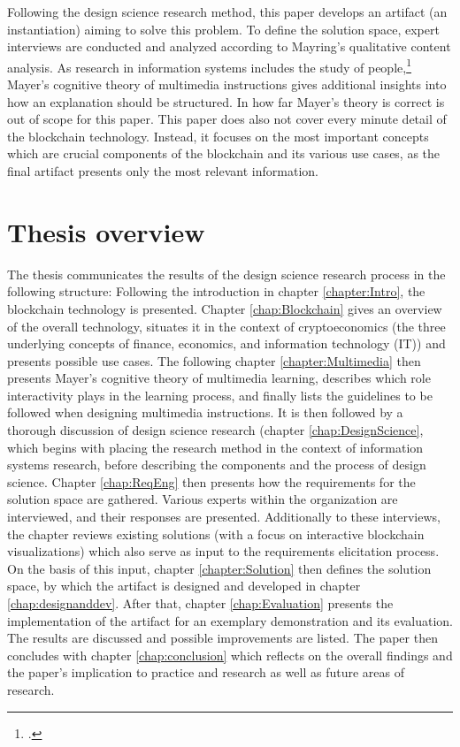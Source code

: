Following the design science research method, this paper develops an artifact (an instantiation) aiming to solve this problem. To define the solution space, expert interviews are conducted and analyzed according to Mayring's qualitative content analysis. As research in information systems includes the study of people,\footcite[Cf.][p.11]{OsterleGestaltungsorientierteWirtschaftsinformatikPladoyer2010} Mayer's cognitive theory of multimedia instructions gives additional insights into how an explanation should be structured. In how far Mayer's theory is correct is out of scope for this paper. This paper does also not cover every minute detail of the blockchain technology. Instead, it focuses on the most important concepts which are crucial components of the blockchain and its various use cases, as the final artifact presents only the most relevant information. 
    
\section{Thesis overview} \label{sec:ThesisOverview}
The thesis communicates the results of the design science research process in the following structure: Following the introduction in chapter \ref{chapter:Intro}, the blockchain technology is presented. Chapter \ref{chap:Blockchain} gives an overview of the overall technology, situates it in the context of cryptoeconomics (the three underlying concepts of finance, economics, and information technology (\acs{IT})) and presents possible use cases. The following chapter \ref{chapter:Multimedia} then presents Mayer's cognitive theory of multimedia learning, describes which role interactivity plays in the learning process, and finally lists the guidelines to be followed when designing multimedia instructions. It is then followed by a thorough discussion of design science research (chapter \ref{chap:DesignScience}, which begins with placing the research method in the context of information systems research, before describing the components and the process of design science. Chapter \ref{chap:ReqEng} then presents how the requirements for the solution space are gathered. Various experts within the organization are interviewed, and their responses are presented. Additionally to these interviews, the chapter reviews existing solutions (with a focus on interactive blockchain visualizations) which also serve as input to the requirements elicitation process. On the basis of this input, chapter \ref{chapter:Solution} then defines the solution space, by which the artifact is designed and developed in chapter \ref{chap:designanddev}. After that, chapter \ref{chap:Evaluation} presents the implementation of the artifact for an exemplary demonstration and its evaluation. The results are discussed and possible improvements are listed. The paper then concludes with chapter \ref{chap:conclusion} which reflects on the overall findings and the paper's implication to practice and research as well as future areas of research.

